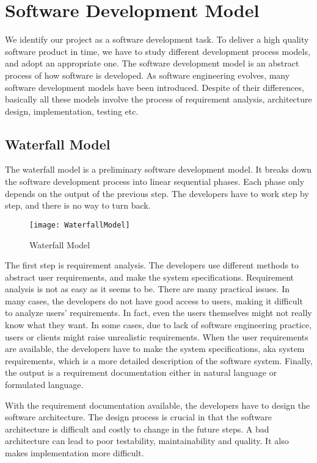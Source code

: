 \chapter{Software Development Model}
We identify our project as a software development task. To deliver a high quality software product in time, we have to study different development process models, and adopt an appropriate one. The software development model is an abstract process of how software is developed. As software engineering evolves, many software development models have been introduced. Despite of their differences, basically all these models involve the process of requirement analysis, architecture design, implementation, testing etc.

\section{Waterfall Model}
The waterfall model is a preliminary software development model. It breaks down the software development process into linear sequential phases. Each phase only depends on the output of the previous step. The developers have to work step by step, and there is no way to turn back.

\begin{figure}[htbp]
\centering
\texttt{[image: WaterfallModel]}
\caption{Waterfall Model\label{fig:Waterfall Model}}
\end{figure}

The first step is requirement analysis. The developers use different methods to abstract user requirements, and make the system specifications. Requirement analysis is not as easy as it seems to be. There are many practical issues. In many cases, the developers do not have good access to users, making it difficult to analyze users' requirements. In fact, even the users themselves might not really know what they want. In some cases, due to lack of software engineering practice, users or clients might raise unrealistic requirements. When the user requirements are available, the developers have to make the system specifications, aka system requirements, which is a more detailed description of the software system. Finally, the output is a requirement documentation either in natural language or formulated language.

With the requirement documentation available, the developers have to design the software architecture. The design process is crucial in that the software architecture is difficult and costly to change in the future steps. A bad architecture can lead to poor testability, maintainability and quality. It also makes implementation more difficult.

